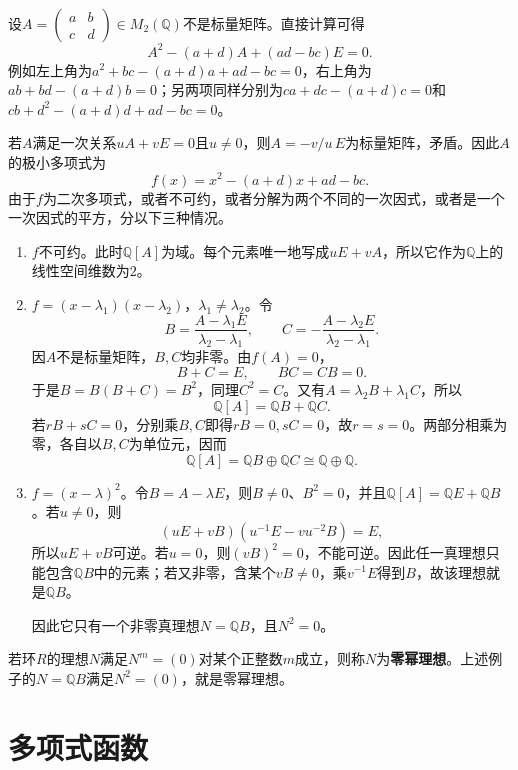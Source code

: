 \begin{example}
设$A=\begin{pmatrix}a&b\\c&d\end{pmatrix}\in M_2(\mathbb Q)$不是标量矩阵。直接计算可得
\[
A^2-(a+d)A+(ad-bc)E=0.
\]
例如左上角为$a^2+bc-(a+d)a+ad-bc=0$，右上角为$ab+bd-(a+d)b=0$；另两项同样分别为$ca+dc-(a+d)c=0$和$cb+d^2-(a+d)d+ad-bc=0$。

若$A$满足一次关系$uA+vE=0$且$u\ne0$，则$A=-v/u\,E$为标量矩阵，矛盾。因此$A$的极小多项式为
\[
f(x)=x^2-(a+d)x+ad-bc.
\]
由于$f$为二次多项式，或者不可约，或者分解为两个不同的一次因式，或者是一个一次因式的平方，分以下三种情况。
\begin{enumerate}

\item $f$不可约。此时$\mathbb Q[A]$为域。每个元素唯一地写成$uE+vA$，所以它作为$\mathbb Q$上的线性空间维数为$2$。

\item $f=(x-\lambda_1)(x-\lambda_2)$，$\lambda_1\ne\lambda_2$。令
\[
B=\frac{A-\lambda_1E}{\lambda_2-\lambda_1},\qquad
C=-\frac{A-\lambda_2E}{\lambda_2-\lambda_1}.
\]
因$A$不是标量矩阵，$B,C$均非零。由$f(A)=0$，
\[
B+C=E,\qquad BC=CB=0.
\]
于是$B=B(B+C)=B^2$，同理$C^2=C$。又有$A=\lambda_2B+\lambda_1C$，所以
\[
\mathbb Q[A]=\mathbb QB+\mathbb QC.
\]
若$rB+sC=0$，分别乘$B,C$即得$rB=0,sC=0$，故$r=s=0$。两部分相乘为零，各自以$B,C$为单位元，因而
\[
\mathbb Q[A]=\mathbb QB\oplus\mathbb QC\cong\mathbb Q\oplus\mathbb Q.
\]

\item $f=(x-\lambda)^2$。令$B=A-\lambda E$，则$B\ne0$、$B^2=0$，并且$\mathbb Q[A]=\mathbb QE+\mathbb QB$。若$u\ne0$，则
\[
(uE+vB)\left(u^{-1}E-vu^{-2}B\right)=E,
\]
所以$uE+vB$可逆。若$u=0$，则$(vB)^2=0$，不能可逆。因此任一真理想只能包含$\mathbb QB$中的元素；若又非零，含某个$vB\ne0$，乘$v^{-1}E$得到$B$，故该理想就是$\mathbb QB$。

因此它只有一个非零真理想$N=\mathbb QB$，且$N^2=0$。
\end{enumerate}
\end{example}

\begin{definition}
若环$R$的理想$N$满足$N^m=(0)$对某个正整数$m$成立，则称$N$为\textbf{零幂理想}。上述例子的$N=\mathbb QB$满足$N^2=(0)$，就是零幂理想。
\end{definition}




\section{多项式函数}

